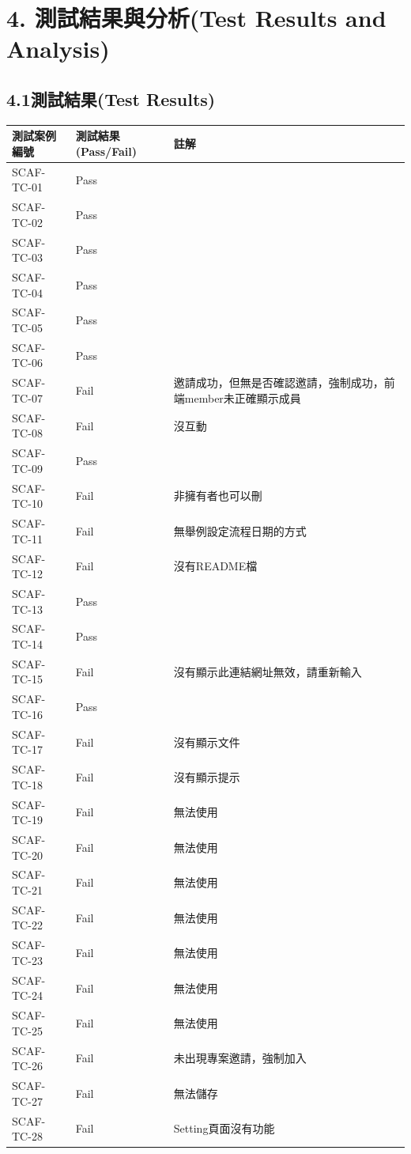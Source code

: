 \documentclass{report}
\begin{document}
\section*{4. 測試結果與分析(Test Results and Analysis)}
\subsection*{4.1測試結果(Test Results)}
\begin{tabularx}{\textwidth}{
  |p{}%
  |p{}%
  |p{}|%
}
  \hline
  測試案例編號 & 測試結果(Pass/Fail) & 註解 \\ \hline
  SCAF-TC-01 & Pass &  \\ \hline
  SCAF-TC-02 & Pass &  \\ \hline
  SCAF-TC-03 & Pass &  \\ \hline
  SCAF-TC-04 & Pass &  \\ \hline
  SCAF-TC-05 & Pass &  \\ \hline
  SCAF-TC-06 & Pass &  \\ \hline
  SCAF-TC-07 & Fail & 邀請成功，但無是否確認邀請，強制成功，前端member未正確顯示成員 \\ \hline
  SCAF-TC-08 & Fail & 沒互動 \\ \hline
  SCAF-TC-09 & Pass &  \\ \hline
  SCAF-TC-10 & Fail & 非擁有者也可以刪 \\ \hline
  SCAF-TC-11 & Fail & 無舉例設定流程日期的方式 \\ \hline
  SCAF-TC-12 & Fail & 沒有README檔 \\ \hline
  SCAF-TC-13 & Pass &  \\ \hline
  SCAF-TC-14 & Pass &  \\ \hline
  SCAF-TC-15 & Fail & 沒有顯示此連結網址無效，請重新輸入 \\ \hline
  SCAF-TC-16 & Pass &  \\ \hline
  SCAF-TC-17 & Fail & 沒有顯示文件 \\ \hline
  SCAF-TC-18 & Fail & 沒有顯示提示 \\ \hline
  SCAF-TC-19 & Fail & 無法使用 \\ \hline
  SCAF-TC-20 & Fail & 無法使用 \\ \hline
  SCAF-TC-21 & Fail & 無法使用 \\ \hline
  SCAF-TC-22 & Fail & 無法使用 \\ \hline
  SCAF-TC-23 & Fail & 無法使用 \\ \hline
  SCAF-TC-24 & Fail & 無法使用 \\ \hline
  SCAF-TC-25 & Fail & 無法使用\\ \hline
  SCAF-TC-26 & Fail & 未出現專案邀請，強制加入 \\ \hline
  SCAF-TC-27 & Fail & 無法儲存 \\ \hline
  SCAF-TC-28 & Fail & Setting頁面沒有功能 \\ \hline
\end{tabularx}
\\
\newline
\\
\end{document}
